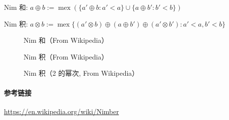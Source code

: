 Nim 和: \(a\oplus b:=\operatorname{mex}\left(\{a'\oplus b:a'<a\}\cup\{a\oplus b':b'<b\}\right)\)

Nim 积: \(a\otimes b:=\operatorname{mex}\{(a'\otimes b)\oplus(a\oplus b')\oplus(a'\otimes b'):a'<a,b'<b\}\)

\begin{figure}
    \label{img:nim-add}
    \centering
    
    \caption{Nim 和（From Wikipedia）}
\end{figure}

\begin{figure}
    \label{img:nim-prod}
    \centering
    
    \caption{Nim 积（From Wikipedia）}
\end{figure}

\begin{figure}
    \label{img:nim-prod-pow2}
    \centering
    
    \caption{Nim 积（2 的幂次, From Wikipedia）}
\end{figure}

\paragraph{参考链接}

\url{https://en.wikipedia.org/wiki/Nimber}
